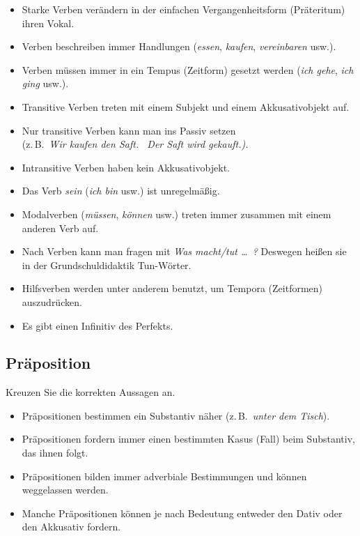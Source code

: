 \documentclass[12pt,a4paper,twoside]{article}
\newcommand{\gruen}[1]{\textcolor{gruen}{#1}}
\newcommand{\morphologieaufgabe}{}
\newcommand{\FUHalbzeile}{\hspace{0.5\baselineskip}}
\newcommand{\morphologieaufgabe}{\textbf{\gruen{Morphologie-Seminar}}\ |\ }
\newcommand{\FUHalbzeile}{}
\newcommand{\Lf}{
  \setlength{\itemsep}{1pt}
  \setlength{\parskip}{0pt}
  \setlength{\parsep}{0pt}
}
\begin{document}
\begin{itemize}[label=\Square]\Lf
  \item Starke Verben verändern in der einfachen Vergangenheitsform (Präteritum) ihren Vokal.
  \item Verben beschreiben immer Handlungen (\textit{essen}, \textit{kaufen}, \textit{vereinbaren} usw.).
  \item Verben müssen immer in ein Tempus (Zeitform) gesetzt werden (\textit{ich gehe}, \textit{ich ging} usw.).
  \item Transitive Verben treten mit einem Subjekt und einem Akkusativobjekt auf.
  \item Nur transitive Verben kann man ins Passiv setzen\\
    (z.\,B.\ \textit{Wir kaufen den Saft. \ Der Saft wird gekauft.).}
  \item Intransitive Verben haben kein Akkusativobjekt.
  \item Das Verb \textit{sein} (\textit{ich bin} usw.) ist unregelmäßig.
  \item Modalverben (\textit{müssen}, \textit{können} usw.) treten immer zusammen mit einem anderen Verb auf.
  \item Nach Verben kann man fragen mit \textit{Was macht\slash tut \ldots\ ?}
    Deswegen heißen sie in der Grundschuldidaktik Tun-Wörter.
  \item Hilfsverben werden unter anderem benutzt, um Tempora (Zeitformen) auszudrücken.
  \item Es gibt einen Infinitiv des Perfekts.
\end{itemize}

\FUHalbzeile

\subsection{\morphologieaufgabe Präposition}

Kreuzen Sie die korrekten Aussagen an.

\begin{itemize}[label=\Square]\Lf
  \item Präpositionen bestimmen ein Substantiv näher (z.\,B.\ \textit{unter dem Tisch}).
  \item Präpositionen fordern immer einen bestimmten Kasus (Fall) beim Substantiv, das ihnen folgt.
  \item Präpositionen bilden immer adverbiale Bestimmungen und können weggelassen werden.
  \item Manche Präpositionen können je nach Bedeutung entweder den Dativ oder den Akkusativ fordern.
\end{itemize}
\end{document}
